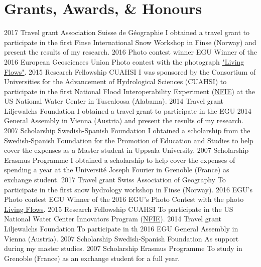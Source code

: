    \section{Grants, Awards, \& Honours}
    \ifacademic
    \position
        {2017}
        {Travel grant}
        {Association Suisse de Géographie}
        {I obtained a travel grant to participate in the first Finse International Snow Workshop in Finse (Norway) and present the results of my research.}
    \position
        {2016}
        {Photo contest winner}
        {EGU}
        {Winner of the 2016 European Geosciences Union Photo contest with the photograph \href{https://blogs.egu.eu/geolog/2016/08/29/imaggeo-on-mondays-living-flows/}{"Living Flows"}.}
    \position
        {2015}
        {Research Fellowship}
        {CUAHSI}
        {I was sponsored by the Consortium of Universities for the Advancement of Hydrological Sciences (CUAHSI) to participate in the first National Flood Interoperability Experiment (\href{https://www.cuahsi.org/education/summerinstitute/}{NFIE}) at the US National Water Center in Tuscaloosa (Alabama).}
    \position
        {2014}
        {Travel grant}
        {Liljewalchs Foundation}
        {I obtained a travel grant to participate in the EGU 2014 General Assembly in Vienna (Austria) and present the results of my research.}
    \position
        {2007}
        {Scholarship}
        {Swedish-Spanish Foundation}
        {I obtained a scholarship from the Swedish-Spanish Foundation for the Promotion of Education and Studies to help cover the expenses as a Master student in Uppsala University.}
    \position
        {2007}
        {Scholarship}
        {Erasmus Programme}
        {I obtained a scholarship to help cover the expenses of spending a year at the Université Joseph Fourier in Grenoble (France) as exchange student.}
    \else
    \position
        {2017}
        {Travel grant}
        {Swiss Association of Geography}
        {To participate in the first snow hydrology workshop in Finse (Norway).}
    \position
        {2016}
        {EGU's Photo contest}
        {EGU}
        {Winner of the 2016 EGU's Photo Contest with the photo \href{https://blogs.egu.eu/geolog/2016/08/29/imaggeo-on-mondays-living-flows/}{Living Flows}.}
    \position
        {2015}
        {Research Fellowship}
        {CUAHSI}
        {To participate in the US National Water Center Innovators Program (\href{https://www.cuahsi.org/education/summerinstitute/}{NFIE}).}
    \position
        {2014}
        {Travel grant}
        {Liljewalchs Foundation}
        {To participate in th 2016 EGU General Assembly in Vienna (Austria).}
    \position
        {2007}
        {Scholarship}
        {Swedish-Spanish Foundation}
        {As support during my master studies.}
    \position
        {2007}
        {Scholarship}
        {Erasmus Programme}
        {To study in Grenoble (France) as an exchange student for a full year.}
    \fi
\fi
